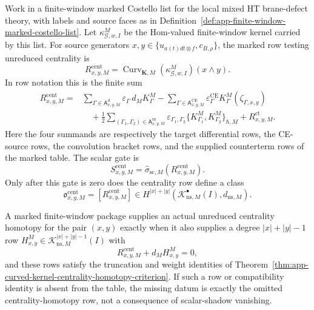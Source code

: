 \begin{prop}
\label{prop:app-marked-row-centrality-homotopy-test}
  Work in a finite-window marked Costello list for the local mixed HT
  brane-defect theory, with labels and source faces as in
  Definition~\ref{def:app-finite-window-marked-costello-list}.  Let
  \(\kappa^M_{\mathcal G,w,I}\) be the Hom-valued finite-window kernel
  carried by this list.  For source generators
  \(x,y\in\{u_{a(t)dt\otimes f},c_{B,\rho}\}\), the marked row testing
  unreduced centrality is
  \[
    R^{\mathrm{cent}}_{x,y,M}
      =
    \operatorname{Curv}_{\mathbf K,M}
      (\kappa^M_{\mathcal G,w,I})(x\wedge y).
  \]
  In row notation this is the finite sum
  \[
  \begin{aligned}
    R^{\mathrm{cent}}_{x,y,M}
      ={}&
      \sum_{\Gamma\in\mathsf A_{x,y,M}^{d}}
        \varepsilon_\Gamma\,d_M K^M_\Gamma
      -\sum_{\Gamma\in\mathsf A_{x,y,M}^{\mathrm{CE}}}
        \varepsilon^{\mathrm{CE}}_\Gamma
        K^M_\Gamma(\zeta_{\Gamma,x,y})  \\
      &\quad
      +\frac12
      \sum_{(\Gamma_1,\Gamma_2)\in
        \mathsf A_{x,y,M}^{\mathrm{br}}}
        \varepsilon_{\Gamma_1,\Gamma_2}
        \{K^M_{\Gamma_1},K^M_{\Gamma_2}\}_{\hbar,M}
      +R^{\mathrm{ct}}_{x,y,M}.
  \end{aligned}
  \]
  Here the four summands are respectively the target differential rows,
  the CE-source rows, the convolution bracket rows, and the supplied
  counterterm rows of the marked table.  The scalar gate is
  \[
    S^{\mathrm{cent}}_{x,y,M}
      =
    \widehat\sigma_{\mathrm{sc},M}
      (R^{\mathrm{cent}}_{x,y,M}).
  \]
  Only after this gate is zero does the centrality row define a class
  \[
    \mathfrak o^{\mathrm{cent}}_{x,y,M}
      =
    [R^{\mathrm{cent}}_{x,y,M}]
      \in
    H^{|x|+|y|}
      (\mathcal K^\bullet_{\mathrm{ns},M}(I),d_{\mathrm{ns},M}).
  \]

  A marked finite-window package supplies an actual unreduced
  centrality homotopy for the pair \((x,y)\) exactly when it also
  supplies a degree \(|x|+|y|-1\) row
  \(H^M_{x,y}\in\mathcal K_{\mathrm{ns},M}^{|x|+|y|-1}(I)\) with
  \[
    R^{\mathrm{cent}}_{x,y,M}+d_M H^M_{x,y}=0,
  \]
  and these rows satisfy the truncation and weight identities of
  Theorem~\ref{thm:app-curved-kernel-centrality-homotopy-criterion}.  If
  such a row or compatibility identity is absent from the table, the
  missing datum is exactly the omitted centrality-homotopy row, not a
  consequence of scalar-shadow vanishing.


\end{prop}
